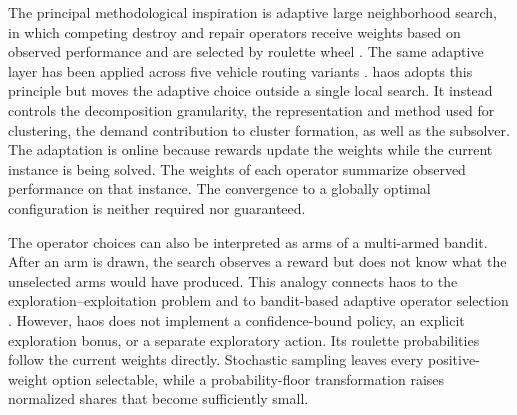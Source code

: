 The principal methodological inspiration is adaptive large neighborhood search, in which competing destroy and repair operators receive weights based on observed performance and are selected by roulette wheel \citep{ropkeAdaptiveLargeNeighborhood2006}. The same adaptive layer has been applied across five vehicle routing variants \citep{pisingerGeneralHeuristicVehicle2007}. \gls{haos} adopts this principle but moves the adaptive choice outside a single local search. It instead controls the decomposition granularity, the representation and method used for clustering, the demand contribution to cluster formation, as well as the subsolver. The adaptation is online because rewards update the weights while the current instance is being solved. The weights of each operator summarize observed performance on that instance. The convergence to a globally optimal configuration is neither required nor guaranteed.

The operator choices can also be interpreted as arms of a multi-armed bandit. After an arm is drawn, the search observes a reward but does not know what the unselected arms would have produced. This analogy connects \gls{haos} to the exploration--exploitation problem \citep{auerFinitetimeAnalysisMultiarmed2002} and to bandit-based adaptive operator selection \citep{fialhoAnalyzingBanditbasedAdaptive2010}. However, \gls{haos} does not implement a confidence-bound policy, an explicit exploration bonus, or a separate exploratory action. Its roulette probabilities follow the current weights directly. Stochastic sampling leaves every positive-weight option selectable, while a probability-floor transformation raises normalized shares that become sufficiently small.

